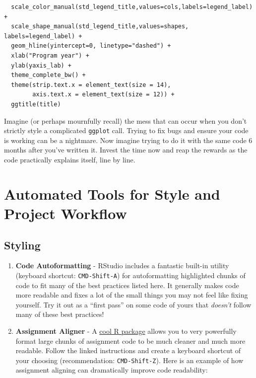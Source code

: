 \documentclass[
]{book}
\begin{document}
\begin{itemize}
\begin{verbatim}
  scale_color_manual(std_legend_title,values=cols,labels=legend_label) +
  scale_shape_manual(std_legend_title,values=shapes, labels=legend_label) +
  geom_hline(yintercept=0, linetype="dashed") +
  xlab("Program year") +
  ylab(yaxis_lab) +
  theme_complete_bw() +
  theme(strip.text.x = element_text(size = 14),
        axis.text.x = element_text(size = 12)) +
  ggtitle(title)
\end{verbatim}

  Imagine (or perhaps mournfully recall) the mess that can occur when you don't strictly style a complicated \texttt{ggplot} call. Trying to fix bugs and ensure your code is working can be a nightmare. Now imagine trying to do it with the same code 6 months after you've written it. Invest the time now and reap the rewards as the code practically explains itself, line by line.
\end{itemize}

\section{Automated Tools for Style and Project Workflow}\label{automated-tools-for-style-and-project-workflow}

\subsection{Styling}\label{styling}

\begin{enumerate}
\def\labelenumi{\arabic{enumi}.}
\item
  \textbf{Code Autoformatting} - RStudio includes a fantastic built-in utility (keyboard shortcut: \texttt{CMD-Shift-A}) for autoformatting highlighted chunks of code to fit many of the best practices listed here. It generally makes code more readable and fixes a lot of the small things you may not feel like fixing yourself. Try it out as a ``first pass'' on some code of yours that \emph{doesn't} follow many of these best practices!
\item
  \textbf{Assignment Aligner} - A \href{https://www.r-bloggers.com/align-assign-rstudio-addin-to-align-assignment-operators/}{cool R package} allows you to very powerfully format large chunks of assignment code to be much cleaner and much more readable. Follow the linked instructions and create a keyboard shortcut of your choosing (recommendation: \texttt{CMD-Shift-Z}). Here is an example of how assignment aligning can dramatically improve code readability:
\end{enumerate}
\end{document}

